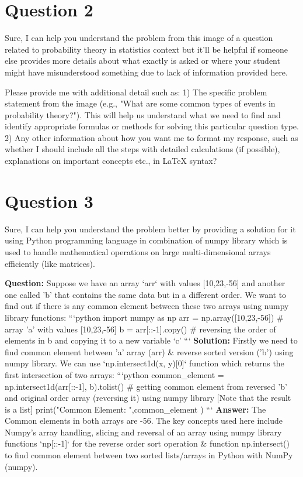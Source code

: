 \documentclass[12pt]{article}
\begin{document}
\newpage\n
\section*{Question 2}\n
Sure, I can help you understand the problem from this image of a question related to probability theory in statistics context but it'll be helpful if someone else provides more details about what exactly is asked or where your student might have misunderstood something due to lack of information provided here. 

Please provide me with additional detail such as:
1) The specific problem statement from the image (e.g., "What are some common types of events in probability theory?"). This will help us understand what we need to find and identify appropriate formulas or methods for solving this particular question type.  2) Any other information about how you want me to format my response, such as whether I should include all the steps with detailed calculations (if possible), explanations on important concepts etc., in LaTeX syntax?

\newpage\n
\section*{Question 3}\n
Sure, I can help you understand the problem better by providing a solution for it using Python programming language in combination of numpy library which is used to handle mathematical operations on large multi-dimensional arrays efficiently (like matrices). 

\textbf{Question:} Suppose we have an array `arr` with values [10,23,-56] and another one called 'b' that contains the same data but in a different order. We want to find out if there is any common element between these two arrays using numpy library functions:
```python 
import numpy as np  
arr = np.array([10,23,-56])    # array 'a' with values [10,23,-56]    
b  = arr[::-1].copy()           # reversing the order of elements in b and copying it to a new variable ‘c’  
```                                                      
\textbf{Solution:}                                                                                           
Firstly we need to find common element between 'a' array (arr) & reverse sorted version ('b') using numpy library. We can use `np.intersect1d(x, y)[0]` function which returns the first intersection of two arrays: 
```python  
common_element = np.intersect1d(arr[::-1], b).tolist()    # getting common element from reversed 'b' and original order array (reversing it) using numpy library     [Note that the result is a list]     
print("Common Element: ",common_element ) 
```                                                                                                          
\textbf{Answer:} The Common elements in both arrays are -56.  
The key concepts used here include Numpy's array handling, slicing and reversal of an array using numpy library functions `np[::-1]` for the reverse order sort operation & function np.intersect() to find common element between two sorted lists/arrays in Python with NumPy (numpy).
\end{document}
